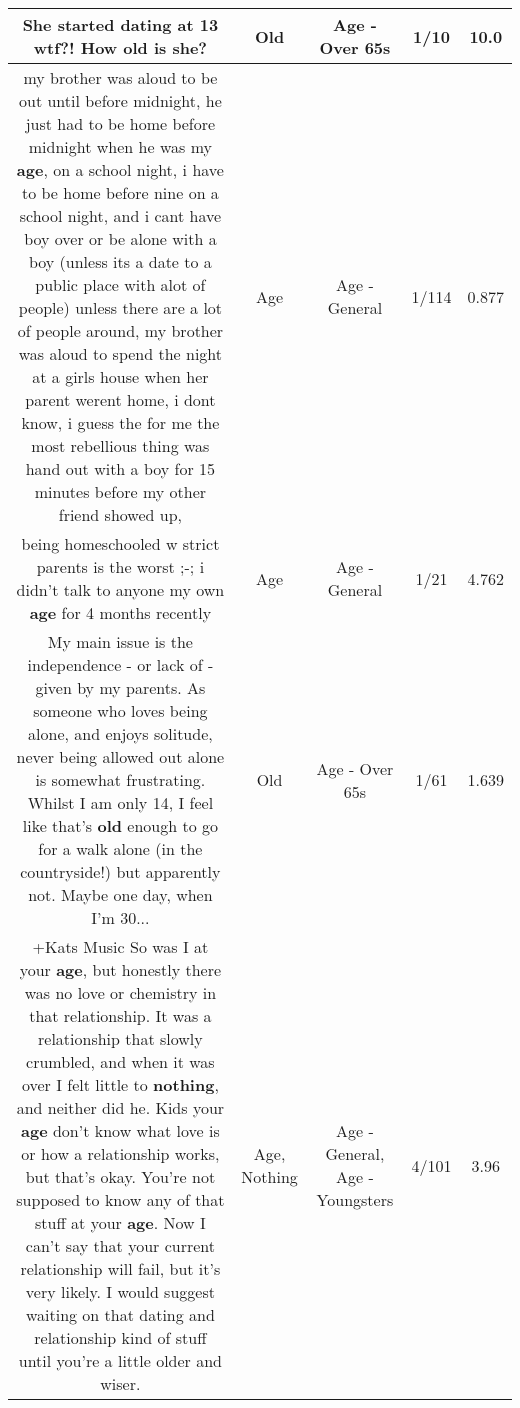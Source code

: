 \documentclass[11pt]{article}
\newlength\mylength
\begin{document}
\begin{center}
\begin{longtable}{|C{.65\mylength}|C{.30\mylength}|C{.12\mylength}|C{.12\mylength}|C{.12\mylength}|}
  \small She started dating at 13 wtf?! How \textbf{old} is she?\normalsize   & Old & Age - Over 65s & 1/10 & 10.0 \\  \hline
  \small my brother was aloud to be out until before midnight, he just had to be home before midnight  when he was my \textbf{age}, on a school night, i have to be home before nine on a school night, and i cant have boy over or be alone with a boy (unless its a date to a public place with alot of people) unless there are a lot of people around, my brother was aloud to spend the night at a girls house when her parent werent home, i dont know, i guess the for me the most rebellious thing was hand out with a boy for 15 minutes  before my other friend showed up,\normalsize   & Age & Age - General & 1/114 & 0.877 \\  \hline
  \small being homeschooled w strict parents is the worst ;-; i didn't talk to anyone my own \textbf{age} for 4 months recently\normalsize   & Age & Age - General & 1/21 & 4.762 \\  \hline
  \small My main issue is the independence - or lack of - given by my parents. As someone who loves being alone, and enjoys solitude, never being allowed out alone is somewhat frustrating. Whilst I am only 14, I feel like that's \textbf{old} enough to go for a walk alone (in the countryside!) but apparently not. Maybe one day, when I'm 30...\normalsize   & Old & Age - Over 65s & 1/61 & 1.639 \\  \hline
  \small +Kats Music So was I at your \textbf{age}, but honestly there was no love or chemistry in that relationship. It was a relationship that slowly crumbled, and when it was over I felt little to \textbf{nothing}, and neither did he. Kids your \textbf{age} don't know what love is or how a relationship works, but that's okay. You're not supposed to know any of that stuff at your \textbf{age}. Now I can't say that your current relationship will fail, but it's very likely. I would suggest waiting on that dating and relationship kind of stuff until you're a little older and wiser.\normalsize   & Age, Nothing & Age - General, Age - Youngsters & 4/101 & 3.96 \\  \hline

\end{longtable}
\end{center}
\end{document}
